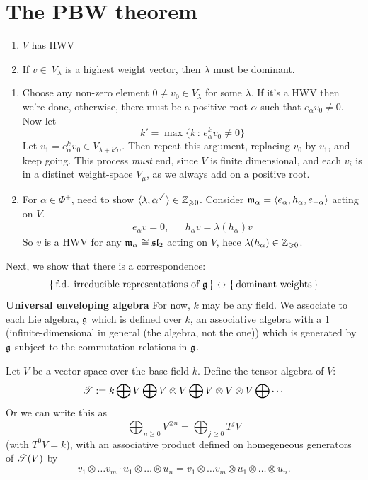 \documentclass{article}
\begin{document}
\section{The PBW theorem}
\begin{fancylem}{}\hspace{0.1cm}
    \begin{enumerate}
        \item $V$ has HWV
        \item If $v \in\ V_{\lambda}$ is a highest weight vector, then $\lambda$ must be dominant.
    \end{enumerate}
\end{fancylem}
\proof \hspace{0.1cm}
\begin{enumerate}
    \item Choose any non-zero element $0 \neq v_{0} \in V_{\lambda}$ for some $\lambda$. If it's a HWV then we're done, otherwise, there must be a positive root $\alpha$ such that $e_{\alpha}v_{0} \neq 0$. Now let \[ k' = \max\{k \, : \, e_{\alpha}^{k}v_{0} \neq 0\}\]
    Let $v_{1} = e_{\alpha}^{k}v_{0} \in V_{\lambda+k'\alpha}$. Then repeat this argument, replacing $v_{0}$ by $v_{1}$, and keep going. This process \textit{must} end, since $V$ is finite dimensional, and each $v_{i}$ is in a distinct weight-space $V_{\mu}$, as we always add on a positive root.
    \item For $\alpha \in \Phi^{+}$, need to show $\langle \lambda, \alpha^{\checked} \rangle \in \bbZ_{\geq 0}$. Consider $\mathfrak{m}_{\alpha} = \langle e_{\alpha},h_{\alpha},e_{-\alpha} \rangle$ acting on $V$. \begin{align*}
        e_{\alpha}v = 0, & & h_{\alpha}v=\lambda(h_{\alpha})v
    \end{align*}
    So $v$ is a HWV for any $\mathfrak{m}_{\alpha} \cong \mathfrak{sl}_{2}$ acting on $V$, hece $\lambda(h_{\alpha}) \in \mathbb{Z}_{\geqslant 0}$.
\end{enumerate}
\endproof
Next, we show that there is a correspondence: \[ \{\,\text{f.d. irreducible representations of $\mathfrak{g}$}\,\} \leftrightarrow \{\,\text{dominant weights}\,\}\]
\large \textbf{Universal enveloping algebra}\gap  \normalsize
For now, $k$ may be any field. We associate to each Lie algebra, $\mathfrak{g}$ which is defined over $k$, an associative algebra with a $1$ (infinite-dimensional in general (the algebra, not the one)) which is generated  by $\mathfrak{g}$ subject to the commutation relations in $\mathfrak{g}$.
\begin{fancydefine}{}
    Let $V$ be a vector space over the base field $k$. Define the tensor algebra of $V$: \[ \mathscr{T} := k \bigoplus V \bigoplus V \otimes V \bigoplus V \otimes V \otimes V \bigoplus \cdots\]
    Or we can write this as \[ \bigoplus_{n \geq 0} V^{\otimes n} = \bigoplus_{j\geq 0} T^{j}V\] (with $T^{0}V =k$), with an associative product defined on homegeneous generators of $\mathscr{T}(V)$ by \[ v_{1} \otimes \dots v_{m} \cdot u_{1} \otimes \dots \otimes u_{n} = v_{1} \otimes \dots v_{m} \otimes u_{1} \otimes \dots \otimes u_{n}.\]
\end{fancydefine}
\end{document}
